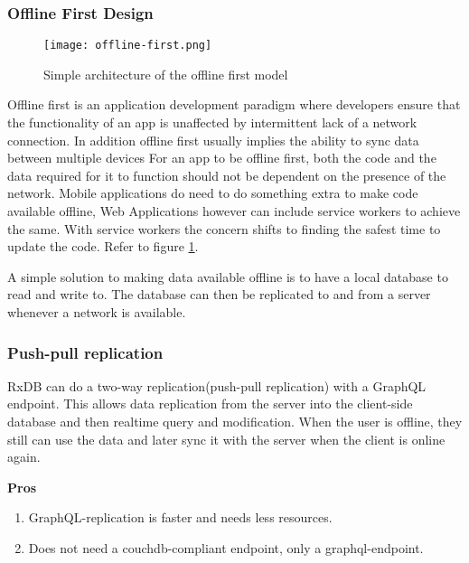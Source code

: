\subsubsection{Offline First Design}

\begin{figure}[h!]
    \begin{center}
        \texttt{[image: offline-first.png]}
    \end{center}
    \caption{Simple architecture of the offline first model}
    \label{fig:offline-first}
\end{figure}

Offline first is an application development paradigm where developers ensure that the 
functionality of an app is unaffected by intermittent lack of a network connection. 
In addition offline first usually implies the ability to sync data between multiple devices
For an app to be offline first, both the code and the data required 
for it to function should not be dependent on the presence of the network.
Mobile applications do need to do something extra to make code available offline,
Web Applications however can include service workers to achieve the same.
With service workers the concern shifts to finding the safest time to update the code. 
Refer to figure \ref{fig:offline-first}.

A simple solution to making data available offline is to have a local database 
to read and write to. The database can then be replicated to and from a 
server whenever a network is available.~\cite{HasuraOfflineFirst}


\subsubsection{Push-pull replication}

RxDB can do a two-way replication(push-pull replication) with a GraphQL endpoint. 
This allows data replication from the server into the client-side database and then 
realtime query and modification.
When the user is offline, they still can use the data and later sync it with the server 
when the client is online again.

\textbf{Pros}
\begin{enumerate}
    \item GraphQL-replication is faster and needs less resources.
    \item Does not need a couchdb-compliant endpoint, only a graphql-endpoint.
\end{enumerate}

